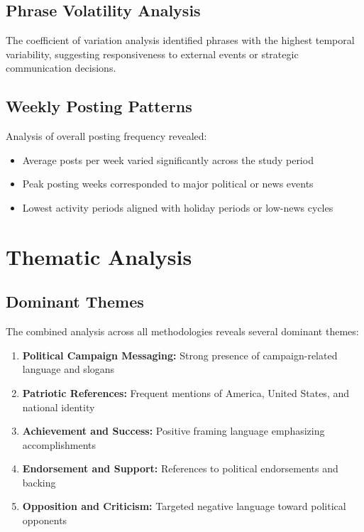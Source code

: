\documentclass[12pt,a4paper]{article}
\begin{document}
\subsection{Phrase Volatility Analysis}

The coefficient of variation analysis identified phrases with the highest temporal variability, suggesting responsiveness to external events or strategic communication decisions.

\subsection{Weekly Posting Patterns}

Analysis of overall posting frequency revealed:
\begin{itemize}
    \item Average posts per week varied significantly across the study period
    \item Peak posting weeks corresponded to major political or news events
    \item Lowest activity periods aligned with holiday periods or low-news cycles
\end{itemize}

\section{Thematic Analysis}

\subsection{Dominant Themes}

The combined analysis across all methodologies reveals several dominant themes:

\begin{enumerate}
    \item \textbf{Political Campaign Messaging:} Strong presence of campaign-related language and slogans
    \item \textbf{Patriotic References:} Frequent mentions of America, United States, and national identity
    \item \textbf{Achievement and Success:} Positive framing language emphasizing accomplishments
    \item \textbf{Endorsement and Support:} References to political endorsements and backing
    \item \textbf{Opposition and Criticism:} Targeted negative language toward political opponents
\end{enumerate}
\end{document}
